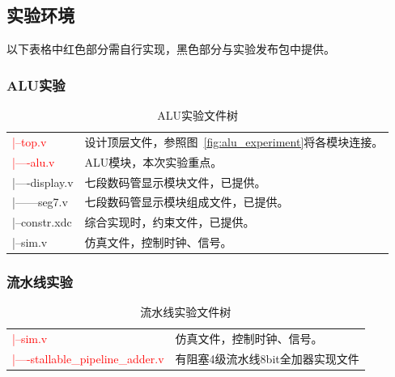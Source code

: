 \subsection{实验环境}
以下表格中红色部分需自行实现，黑色部分与实验发布包中提供。

\subsubsection{ALU实验}

\begin{table}[htbp]
    \centering
    \begin{tabu}{|l|l|}
        \hline
        \textcolor{red}{|--top.v}& 设计顶层文件，参照图~\ref{fig:alu_experiment}将各模块连接。 \\
        \textcolor{red}{|----alu.v}& ALU模块，本次实验重点。 \\
        \rowfont{\color{gray}}
        |----display.v& 七段数码管显示模块文件，已提供。 \\
        \rowfont{\color{gray}}
        |------seg7.v& 七段数码管显示模块组成文件，已提供。 \\
        \rowfont{\color{gray}}
        |--constr.xdc&综合实现时，约束文件，已提供。  \\
        
        \rowfont{\color{red}}
        |--sim.v
        & 仿真文件，控制时钟、信号。 \\
        \hline
    \end{tabu}
    \caption{ALU实验文件树}
    \label{tab:alu_file_tree}
\end{table}

\subsubsection{流水线实验}



\begin{table}[htbp]
    \centering
    \begin{tabular}{|l|l|}
        \hline
        \textcolor{red}{|--sim.v} & 仿真文件，控制时钟、信号。 \\
        \textcolor{red}{|----stallable\_pipeline\_adder.v} & 有阻塞4级流水线8bit全加器实现文件 \\
        \hline
    \end{tabular}
    \caption{流水线实验文件树}
    \label{tab:pipeline_file_tree}
\end{table}
